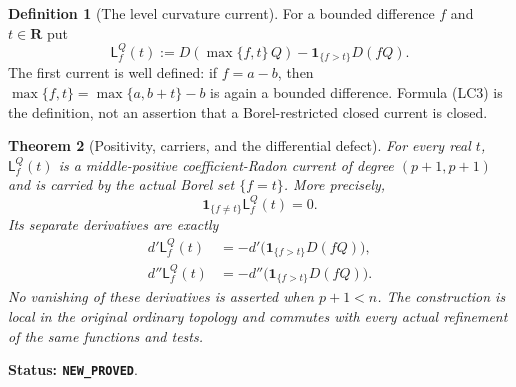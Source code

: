 \documentclass[11pt,a4paper]{article}
\numberwithin{equation}{section}
\newtheorem{theorem}{Theorem}[section]
\theoremstyle{definition}
\newtheorem{definition}[theorem]{Definition}
\theoremstyle{remark}
\begin{document}
\begin{definition}[The level curvature current]
\label{def:r11-level-current}
For a bounded difference $f$ and $t\in\mathbf R$ put
\[
 \mathsf L^Q_f(t)
 :=D(\max\{f,t\}\,Q)
                 -\mathbf1_{\{f>t\}}D(fQ).
 \tag{LC3}
\]
The first current is well defined: if $f=a-b$, then
$\max\{f,t\}=\max\{a,b+t\}-b$ is again a bounded
difference.  Formula (LC3) is the definition, not an assertion
that a Borel-restricted closed current is closed.
\end{definition}

\begin{theorem}[Positivity, carriers, and the differential defect]
\label{thm:r11-positive-level-current}
For every real $t$, $\mathsf L^Q_f(t)$ is a middle-positive
coefficient-Radon current of degree $(p+1,p+1)$ and is carried by
the actual Borel set $\{f=t\}$.  More precisely,
\[
 \mathbf1_{\{f\ne t\}}\mathsf L^Q_f(t)=0.
 \tag{LC4}
\]
Its separate derivatives are exactly
\[
 \begin{split}
 d'\mathsf L^Q_f(t)
       &=-d'\bigl(\mathbf1_{\{f>t\}}D(fQ)\bigr),\\
 d''\mathsf L^Q_f(t)
       &=-d''\bigl(\mathbf1_{\{f>t\}}D(fQ)\bigr).
 \end{split}
 \tag{LC5}
\]
No vanishing of these derivatives is asserted when $p+1<n$.
The construction is local in the original ordinary topology and
commutes with every actual refinement of the same functions and tests.
\end{theorem}

\noindent\textbf{Status: \texttt{NEW\_PROVED}}.
\end{document}
